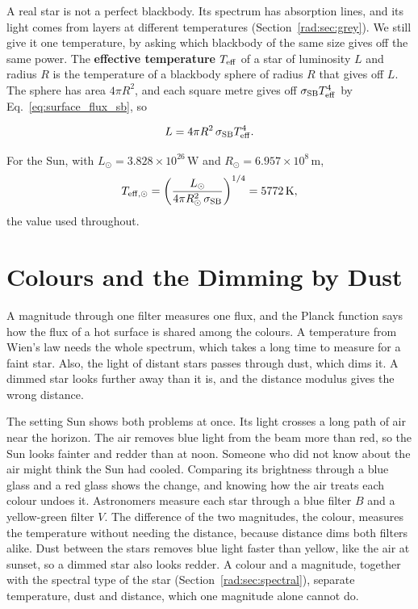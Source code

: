 A real star is not a perfect blackbody. Its spectrum has absorption lines, and its light comes from layers at different temperatures (Section~\ref{rad:sec:grey}). We still give it one temperature, by asking which blackbody of the same size gives off the same power. The \textbf{effective temperature} $T_{\rm eff}$ of a star of luminosity $L$ and radius $R$ is the temperature of a blackbody sphere of radius $R$ that gives off $L$. The sphere has area $4\pi R^2$, and each square metre gives off $\sigma_{\rm SB}T_{\rm eff}^4$ by Eq.~\eqref{eq:surface_flux_sb}, so
\begin{keyresult}
	\begin{equation}
		L = 4\pi R^2\,\sigma_{\rm SB} T_{\rm eff}^4.
		\label{eq:stefan_boltzmann_luminosity}
	\end{equation}
\end{keyresult}
For the Sun, with $L_\odot=3.828\times10^{26}\,\mathrm W$ and $R_\odot=6.957\times10^8\,\mathrm m$,
\[
T_{\rm eff,\odot}=\left(\frac{L_\odot}{4\pi R_\odot^2\,\sigma_{\rm SB}}\right)^{1/4}=5772\,\mathrm K,
\]
the value used throughout.

\section{Colours and the Dimming by Dust}
\label{ph:sec:colour}

A magnitude through one filter measures one flux, and the Planck function says how the flux of a hot surface is shared among the colours. A temperature from Wien's law needs the whole spectrum, which takes a long time to measure for a faint star. Also, the light of distant stars passes through dust, which dims it. A dimmed star looks further away than it is, and the distance modulus gives the wrong distance.

The setting Sun shows both problems at once. Its light crosses a long path of air near the horizon. The air removes blue light from the beam more than red, so the Sun looks fainter and redder than at noon. Someone who did not know about the air might think the Sun had cooled. Comparing its brightness through a blue glass and a red glass shows the change, and knowing how the air treats each colour undoes it. Astronomers measure each star through a blue filter $B$ and a yellow-green filter $V$. The difference of the two magnitudes, the colour, measures the temperature without needing the distance, because distance dims both filters alike. Dust between the stars removes blue light faster than yellow, like the air at sunset, so a dimmed star also looks redder. A colour and a magnitude, together with the spectral type of the star (Section~\ref{rad:sec:spectral}), separate temperature, dust and distance, which one magnitude alone cannot do.

